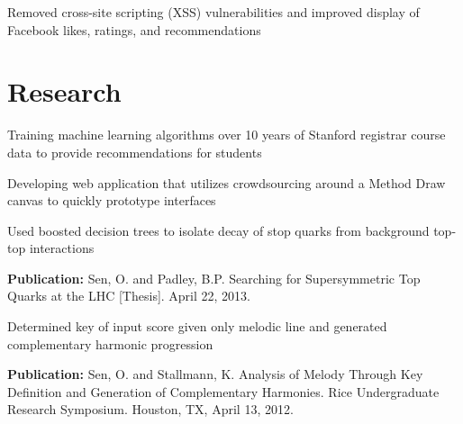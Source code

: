 \documentclass{onkursen-resume}
\begin{document}
\begin{itemize*}
\item Removed cross-site scripting (XSS) vulnerabilities and improved display of Facebook likes, ratings, and recommendations
\end{itemize*}

\hr

\section*{Research}

\begin{itemize*}
\item Training machine learning algorithms over 10 years of Stanford registrar course data to provide recommendations for students
\end{itemize*}


\begin{itemize*}
\item Developing web application that utilizes crowdsourcing around a Method Draw canvas to quickly prototype interfaces
\end{itemize*}

\begin{itemize*}
\item Used boosted decision trees to isolate decay of stop quarks from background top-top interactions
\item {\bf Publication:} Sen, O. and Padley, B.P. Searching for Supersymmetric Top Quarks at the LHC [Thesis]. April 22, 2013.
\end{itemize*}


\begin{itemize*}
\item Determined key of input score given only melodic line and generated complementary harmonic progression
\item {\bf Publication:} Sen, O. and Stallmann, K. Analysis of Melody Through Key Definition and Generation of Complementary Harmonies. Rice Undergraduate Research Symposium. Houston, TX, April 13, 2012.
\end{itemize*}
\end{document}
